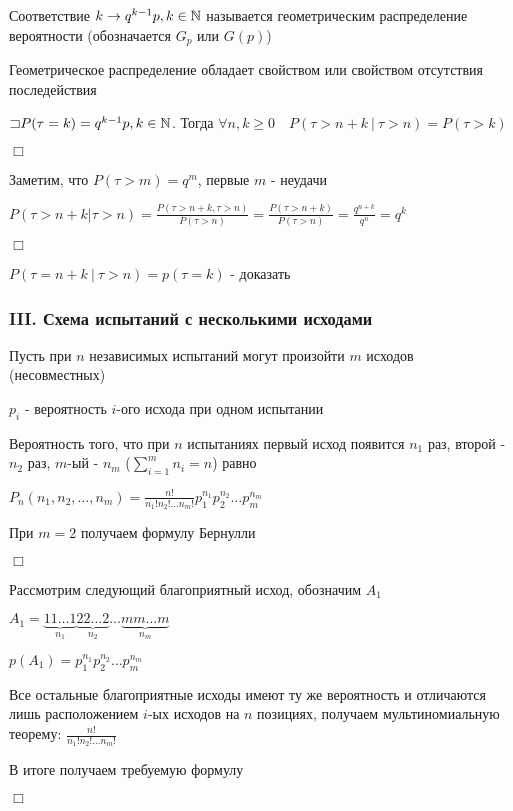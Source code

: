 \documentclass[12pt]{article}
\begin{document}
    \hypertarget{geometricdistribution}{}

    \Def Соответствие $k \rightarrow q^{k - 1} p, k \in \mathbb{N}$ называется геометрическим
    распределение вероятности (обозначается $G_p$ или $G(p)$)

    \Nota Геометрическое распределение обладает свойством  или свойством отсутствия
    последействия

    \begin{MyTheorem}
        \Ths $\mathord{\sqsupset} P(\tau = k) = q^{k - 1} p, k \in \mathbb{N}$. Тогда $\forall n, k \geq 0 \quad P(\tau > n + k \ | \ \tau > n) = P(\tau > k)$
    \end{MyTheorem}

    \begin{MyProof}
        $\Box$

        Заметим, что $P(\tau > m) = q^m$, первые $m$ - неудачи

        $P(\tau > n + k | \tau > n) = \frac{P(\tau > n + k, \tau > n)}{P(\tau > n)} = \frac{P(\tau > n + k)}{P(\tau > n)} = \frac{q^{n + k}}{q^n} = q^k$

        $\Box$
    \end{MyProof}

    \Nota $P(\tau = n + k \ | \ \tau > n) = p(\tau = k)$ - \Lab доказать

    \subsubsection{III. Схема испытаний с несколькими исходами}

    Пусть при $n$ независимых испытаний могут произойти $m$ исходов (несовместных)

    $p_i$ - вероятность $i$-ого исхода при одном испытании

    \begin{MyTheorem}
        \Ths Вероятность того, что при $n$ испытаниях первый исход появится $n_1$ раз, второй - $n_2$ раз, $m$-ый - $n_m$ ($\sum_{i = 1}^m n_i = n$)
        равно

        $P_n(n_1, n_2, \dots, n_m) = \frac{n!}{n_1! n_2! \dots n_m!} p_1^{n_1} p_2^{n_2} \dots p_m^{n_m}$
    \end{MyTheorem}

    При $m = 2$ получаем формулу Бернулли

    \begin{MyProof}
        $\Box$

        Рассмотрим следующий благоприятный исход, обозначим $A_1$

        $A_1 = \underset{n_1}{\underbrace{11\dots1}}\underset{n_2}{\underbrace{22\dots2}}\dots\underset{n_m}{\underbrace{mm\dots m}}$

        $p(A_1) = p_1^{n_1} p_2^{n_2} \dots p_m^{n_m}$

        Все остальные благоприятные исходы имеют ту же вероятность и отличаются лишь расположением $i$-ых исходов на $n$ позициях,
        получаем мультиномиальную теорему: $\frac{n!}{n_1! n_2! \dots n_m!}$

        В итоге получаем требуемую формулу

        $\Box$
    \end{MyProof}
\end{document}
